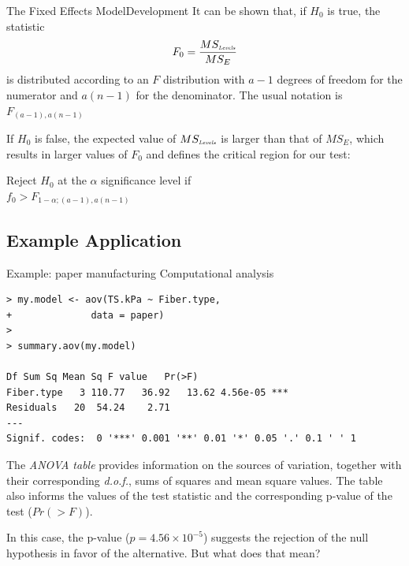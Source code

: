 %
%
\begin{frame}{The Fixed Effects Model}{Development}
It can be shown that, if $H_0$ is true, the statistic
\begin{equation*}
F_0 = \frac{MS_{\mbox{\tiny\textit{Levels}}}}{MS_E}
\end{equation*}
is distributed according to an $F$ distribution with $a-1$ degrees of freedom for the numerator and $a(n-1)$ for the denominator.  The usual notation is $F_{\left(a-1\right),a(n-1)}$
\bigskip

If $H_0$ is false, the expected value of $MS_{\mbox{\tiny\textit{Levels}}}$ is larger than that of $MS_E$, which results in larger values of $F_0$ and defines the critical region for our test:
\begin{block}{}
\centering Reject $H_0$ at the $\alpha$ significance level if\\$f_0>F_{1-\alpha;(a-1),a(n-1)}$
\end{block}
\end{frame}



%
%
\subsection{Example Application}
\begin{frame}[fragile]
{Example: paper manufacturing}
{Computational analysis}

{\smaller
\begin{verbatim}
> my.model <- aov(TS.kPa ~ Fiber.type,
+              data = paper)
>
> summary.aov(my.model)

Df Sum Sq Mean Sq F value   Pr(>F)
Fiber.type   3 110.77   36.92   13.62 4.56e-05 ***
Residuals   20  54.24    2.71
---
Signif. codes:  0 '***' 0.001 '**' 0.01 '*' 0.05 '.' 0.1 ' ' 1
\end{verbatim}}

The \textit{ANOVA table} provides information on the sources of variation, together with their corresponding \textit{d.o.f.}, sums of squares and mean square values. The table also informs the values of the test statistic and the corresponding p-value of the test ($Pr(>F)$).
\bigskip

In this case, the p-value ($p = 4.56\times 10^{-5}$) suggests the rejection of the null hypothesis in favor of the alternative. But what does that mean?
\end{frame}

